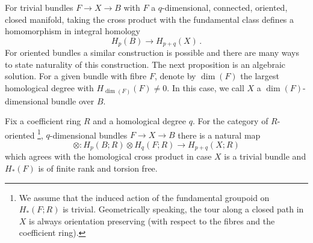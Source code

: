 For trivial bundles $F \to X \to B$ with $F$ a $q$-dimensional, connected, oriented, closed manifold,
taking the cross product with the fundamental class defines a homomorphism in integral homology
\[
    H_p(B) \to H_{p+q}(X) \,.
\]
For oriented bundles a similar construction is possible and there are many ways to state naturality of this construction.
The next proposition is an algebraic solution.
For a given bundle with fibre $F$, denote by $\dim(F)$ the largest homological degree with $H_{\dim(F)}(F) \neq 0$.
\label{page:q_dim_bundle}%
In this case, we call $X$ a $\dim(F)$-dimensional bundle over $B$.
\begin{prop}
    \label{homology_operations:parallel_bundles:generalized_cross_product}
    Fix a coefficient ring $R$ and a homological degree $q$.
    For the category of $R$-oriented%
    \footnote{
        We assume that the induced action of the fundamental groupoid on $H_\ast(F;R)$ is trivial.
        Geometrically speaking, the tour along a closed path in $X$ is always orientation preserving (with respect to the fibres and the coefficient ring).
    },
    $q$-dimensional bundles $F \to X \to B$ there is a natural map
    \[
        \otimes \colon H_p(B;R) \otimes H_q(F;R) \to H_{p+q}(X;R)
    \]
    which agrees with the homological cross product in case $X$ is a trivial bundle and $H_\ast(F)$ is of finite rank and torsion free.
\end{prop}

